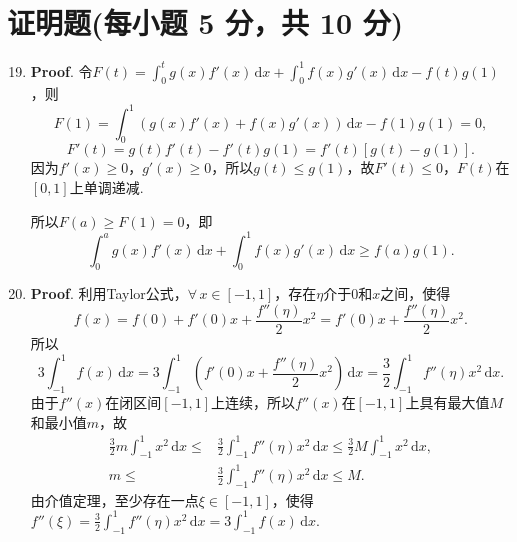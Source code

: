 \documentclass[../main.tex]{subfiles}
\begin{document}
\section{证明题(每小题 5 分，共 10 分)}
\begin{enumerate}
    \setcounter{enumi}{18}
    \item \textbf{Proof}. 令$F(t)=\int_{0}^{t}g(x)f'(x)\,\mathrm{d}x+\int_{0}^{1}
              f(x)g'(x)\,\mathrm{d}x-f(t)g(1)$，则
          \[
              F(1)=\int_{0}^{1}\left(g(x)f'(x)+f(x)g'(x)\right)\,\mathrm{d}x-f(1)g(1)=0,
          \]
          \[
              F'(t)=g(t)f'(t)-f'(t)g(1)=f'(t)\left[g(t)-g(1)\right].
          \]
          因为$f'(x)\geq 0$，$g'(x)\geq 0$，所以$g(t)\leq g(1)$，故$F'(t)\leq 0$，$F(
              t)$在$[0,1]$上单调递减.

          所以$F(a)\geq F(1)=0$，即
          \[
              \int_{0}^{a}g(x)f'(x)\,\mathrm{d}x+\int_{0}^{1}f(x)
              g'(x)\,\mathrm{d}x\geq f(a)g(1).
          \]

    \item \textbf{Proof}. 利用Taylor公式，$\forall\,x\in[-1,1]$，存在$\eta$介于$0$和$x$之间，使得
          \[
              f(x)=f(0)+f'(0)x+\frac{f''(\eta)}{2}x^{2}=f'(0)x+\frac{f''(\eta)}{2}x^{2}
              .
          \]
          所以
          \[
              3\int_{-1}^{1}f(x)\,\mathrm{d}x=3\int_{-1}^{1}\left(f'(0)x+\frac{f''(\eta)}{2}
              x^{2}\right)\,\mathrm{d}x=\frac{3}{2}\int_{-1}^{1}f''(\eta)x^{2}\,\mathrm{d}x.
          \]
          由于$f''(x)$在闭区间$[-1,1]$上连续，所以$f''(x)$在$[-1,1]$上具有最大值$M$和最小值$m$，故
          \[
              \begin{aligned}
                  \frac{3}{2}m\int_{-1}^{1}x^{2}\,\mathrm{d}x\leq {} & \frac{3}{2}\int_{-1}^{1}f''(\eta)x^{2}\,\mathrm{d}x\leq \frac{3}{2}M\int_{-1}^{1}x^{2}\,\mathrm{d}x, \\
                  m\leq                                           {} & \frac{3}{2}\int_{-1}^{1}f''(\eta)x^{2}\,\mathrm{d}x\leq M.
              \end{aligned}
          \]
          由介值定理，至少存在一点$\xi\in[-1,1]$，使得$f''(\xi)=\frac{3}{2}\int_{-1}^{1}
              f''(\eta)x^{2}\,\mathrm{d}x=3\int_{-1}^{1}f(x)\,\mathrm{d}x$.
\end{enumerate}
\end{document}
